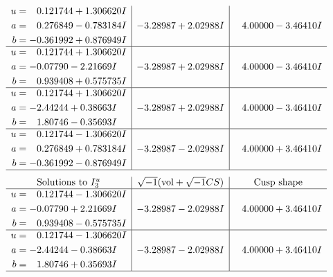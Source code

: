 \documentclass[1p]{elsarticle_modified}
\theoremstyle{definition}
\newcommand{\I}{\sqrt{-1}}
\begin{document}
$$\begin{array}{c|c|c}
\begin{aligned}
u &= \phantom{-}0.121744 + 1.306620 I \\
a &= \phantom{-}0.276849 - 0.783184 I \\
b &= -0.361992 + 0.876949 I\end{aligned}
 & -3.28987 + 2.02988 I & \phantom{-}4.00000 - 3.46410 I \\ \hline\begin{aligned}
u &= \phantom{-}0.121744 + 1.306620 I \\
a &= -0.07790 - 2.21669 I \\
b &= \phantom{-}0.939408 + 0.575735 I\end{aligned}
 & -3.28987 + 2.02988 I & \phantom{-}4.00000 - 3.46410 I \\ \hline\begin{aligned}
u &= \phantom{-}0.121744 + 1.306620 I \\
a &= -2.44244 + 0.38663 I \\
b &= \phantom{-}1.80746 - 0.35693 I\end{aligned}
 & -3.28987 + 2.02988 I & \phantom{-}4.00000 - 3.46410 I \\ \hline\begin{aligned}
u &= \phantom{-}0.121744 - 1.306620 I \\
a &= \phantom{-}0.276849 + 0.783184 I \\
b &= -0.361992 - 0.876949 I\end{aligned}
 & -3.28987 - 2.02988 I & \phantom{-}4.00000 + 3.46410 I\\
 \hline 
 \end{array}$$\newpage$$\begin{array}{c|c|c}  
\text{Solutions to }I^u_{3}& \I (\text{vol} + \sqrt{-1}CS) & \text{Cusp shape}\\
 \hline 
\begin{aligned}
u &= \phantom{-}0.121744 - 1.306620 I \\
a &= -0.07790 + 2.21669 I \\
b &= \phantom{-}0.939408 - 0.575735 I\end{aligned}
 & -3.28987 - 2.02988 I & \phantom{-}4.00000 + 3.46410 I \\ \hline\begin{aligned}
u &= \phantom{-}0.121744 - 1.306620 I \\
a &= -2.44244 - 0.38663 I \\
b &= \phantom{-}1.80746 + 0.35693 I\end{aligned}
 & -3.28987 - 2.02988 I & \phantom{-}4.00000 + 3.46410 I\\
 \hline 
 \end{array}$$\newpage\newpage\renewcommand{\arraystretch}{1}
\end{document}
